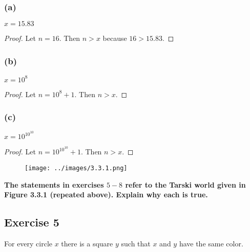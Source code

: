 \documentclass[14pt]{extarticle}
\begin{document}
\subsubsection{(a)}
$x = 15.83$

\begin{proof}
    Let $n = 16$. Then $n > x$ because $16 > 15.83$.
\end{proof}

\subsubsection{(b)}
$x = 10^8$

\begin{proof}
    Let $n = 10^8 + 1$. Then $n > x$.
\end{proof}

\subsubsection{(c)}
$x = 10^{10^{10}}$

\begin{proof}
    Let $n = 10^{10^{10}} + 1$. Then $n > x$.
\end{proof}

\begin{figure}[ht!]
    \centering
    \texttt{[image: ../images/3.3.1.png]}
\end{figure}

{\bf \color{cyan} The statements in exercises $5-8$ refer to the Tarski world given in Figure 3.3.1 (repeated above). Explain why each is true.}

\subsection{Exercise 5}
For every circle $x$ there is a square $y$ such that $x$ and $y$ have the same color.
\end{document}
